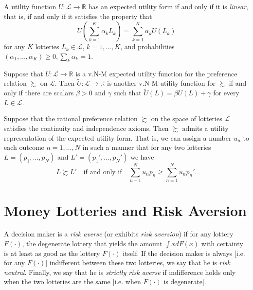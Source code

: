\begin{prop}
    A utility function $U : \mathscr{L} \rightarrow \mathbb{R}$ has an expected utility form if and only if it is \emph{linear}, that is, if and only if it satisfies the property that
    \begin{equation*}
        U \left( \sum_{k = 1}^K \alpha_k L_k \right) = \sum_{k = 1}^K \alpha_k U(L_k)
    \end{equation*}
    for any $K$ lotteries $L_k \in \mathscr{L}$, $k = 1, \dots, K$, and probabilities $(\alpha_1, \dots, \alpha_K) \geq 0, \sum_k \alpha_k = 1$.
\end{prop}

\begin{prop}
    Suppose that $U : \mathscr{L} \rightarrow \mathbb{R}$ is a v.N-M expected utility function for the preference relation $\succsim$ on $\mathscr{L}$. Then $\tilde{U} : \mathscr{L} \rightarrow \mathbb{R}$ is another v.N-M utility function for $\succsim$ if and only if there are scalars $\beta > 0$ and $\gamma$ such that $\tilde{U}(L) = \beta U(L) + \gamma$ for every $L \in \mathscr{L}$.
\end{prop}

\begin{prop}
    Suppose that the rational preference relation $\succsim$ on the space of lotteries $\mathscr{L}$ satisfies the continuity and independence axioms. Then $\succsim$ admits a utility representation of the expected utility form. That is, we can assign a number $u_n$ to each outcome $n = 1, \dots, N$ in such a manner that for any two lotteries $L = (p_1, \dots, p_N)$ and $L' = (p_1', \dots, p_N')$ we have
    \begin{equation*}
        L \succsim L' \quad \text{if and only if} \quad \sum_{n - 1}^N u_n p _n \geq \sum_{n = 1}^N u_n p_n'.
    \end{equation*}
\end{prop}


\section{Money Lotteries and Risk Aversion}

\begin{defn}
    A decision maker is a \emph{risk averse} (or exhibits \emph{risk aversion}) if for any lottery $F(\cdot)$, the degenerate lottery that yields the amount $\int x dF(x)$ with certainty is at least as good as the lottery $F(\cdot)$ itself. If the decision maker is always [i.e. for any $F(\cdot)$] indifferent between these two lotteries, we say that he is \emph{risk neutral}. Finally, we say that he is \emph{strictly risk averse} if indifference holds only when the two lotteries are the same [i.e. when $F(\cdot)$ is degenerate].
\end{defn}


